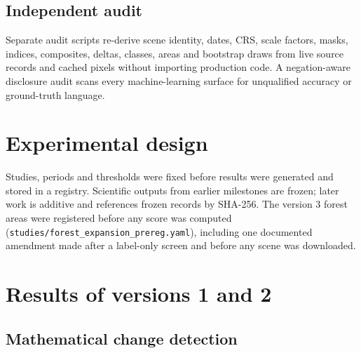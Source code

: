 \documentclass[11pt]{article}
\begin{document}
\subsection{Independent audit}

Separate audit scripts re-derive scene identity, dates, CRS, scale factors, masks, indices, composites, deltas, classes, areas and bootstrap draws from live source records and cached pixels without importing production code. A negation-aware disclosure audit scans every machine-learning surface for unqualified accuracy or ground-truth language.

\section{Experimental design}

Studies, periods and thresholds were fixed before results were generated and stored in a registry. Scientific outputs from earlier milestones are frozen; later work is additive and references frozen records by SHA-256. The version 3 forest areas were registered before any score was computed (\texttt{studies/forest\_expansion\_prereg.yaml}), including one documented amendment made after a label-only screen and before any scene was downloaded.

\section{Results of versions 1 and 2}

\subsection{Mathematical change detection}

\begin{table}[t]\centering\small
\caption{Recorded signal at $|\Delta| \geq 0.15$ for each study.}\label{tab:math}
\end{table}
\end{document}
